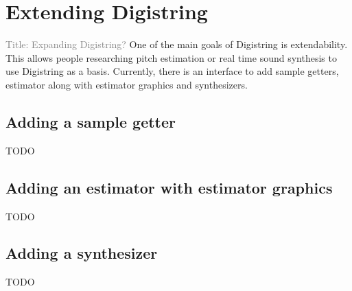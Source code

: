 \documentclass[10pt,twocolumn]{article}
\begin{document}
\section{Extending Digistring}  \label{sec:add_to_digistring}
\textcolor{gray}{Title: Expanding Digistring?}
One of the main goals of Digistring is extendability. This allows people researching pitch estimation or real time sound synthesis to use Digistring as a basis. Currently, there is an interface to add sample getters, estimator along with estimator graphics and synthesizers.


\subsection{Adding a sample getter}
TODO


\subsection{Adding an estimator with estimator graphics}
TODO


\subsection{Adding a synthesizer}
TODO




% 

\end{document}
